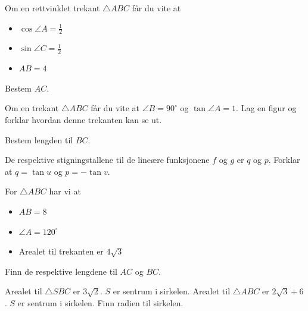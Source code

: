 
Om en rettvinklet trekant $\triangle ABC$ får du vite at
\begin{itemize}
	\item $\cos \angle A=\frac{1}{2}$
	\item $\sin \angle C=\frac{1}{2}$
	\item $AB=4$
\end{itemize}
Bestem $AC$.


Om en trekant $\triangle ABC$ får du vite at $\angle B=90^\circ$ og $\tan \angle A=1$. Lag en figur og forklar hvordan denne trekanten kan se ut.

Bestem lengden til $ BC $.

 \vs \vspace{4pt}


\newpage


De respektive stigningstallene til de lineære funksjonene $f$ og $g$ er $q$ og $p$.
Forklar at $q=\tan u$ og $p=-\tan v$.

For $\triangle ABC$ har vi at
\begin{itemize}
	\item $AB=8$
	\item $\angle A=120^\circ$
	\item Arealet til trekanten er $4\sqrt{3}$
\end{itemize}
Finn de respektive lengdene til $AC$ og $BC$.


Arealet til $\triangle SBC$ er $3\sqrt{2}$. $S$ er sentrum i sirkelen.
\newpage
{}
Arealet til $\triangle ABC$ er $2\sqrt{3}+6$. $S$ er sentrum i sirkelen. Finn radien til sirkelen.

